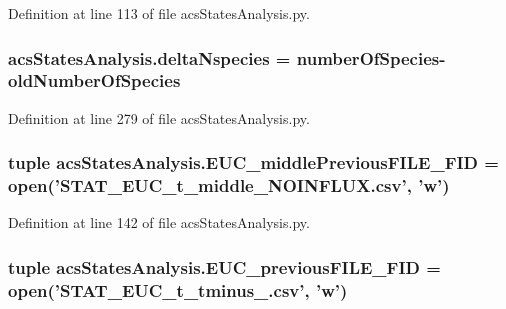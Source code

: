 Definition at line 113 of file acs\-States\-Analysis.\-py.

\hypertarget{a00104_a555117703c3245ec7d3d73f5d991c8c5}{
\subsubsection[{delta\-Nspecies}]{\setlength{\rightskip}{0pt plus 5cm}acs\-States\-Analysis.\-delta\-Nspecies = number\-Of\-Species-\/{\bf old\-Number\-Of\-Species}}}\label{a00104_a555117703c3245ec7d3d73f5d991c8c5}


Definition at line 279 of file acs\-States\-Analysis.\-py.

\hypertarget{a00104_afcb9ec3ed11cfcacae8f796af7605425}{
\subsubsection[{E\-U\-C\-\_\-middle\-Previous\-F\-I\-L\-E\-\_\-\-F\-I\-D}]{\setlength{\rightskip}{0pt plus 5cm}tuple acs\-States\-Analysis.\-E\-U\-C\-\_\-middle\-Previous\-F\-I\-L\-E\-\_\-\-F\-I\-D = open('S\-T\-A\-T\-\_\-\-E\-U\-C\-\_\-t\-\_\-middle\-\_\-\-N\-O\-I\-N\-F\-L\-U\-X.\-csv', 'w')}}\label{a00104_afcb9ec3ed11cfcacae8f796af7605425}


Definition at line 142 of file acs\-States\-Analysis.\-py.

\hypertarget{a00104_a3548edac9afffda077dcbd2876616b39}{
\subsubsection[{E\-U\-C\-\_\-previous\-F\-I\-L\-E\-\_\-\-F\-I\-D}]{\setlength{\rightskip}{0pt plus 5cm}tuple acs\-States\-Analysis.\-E\-U\-C\-\_\-previous\-F\-I\-L\-E\-\_\-\-F\-I\-D = open('S\-T\-A\-T\-\_\-\-E\-U\-C\-\_\-t\-\_\-tminus\-\_.\-csv', 'w')}}\label{a00104_a3548edac9afffda077dcbd2876616b39}


